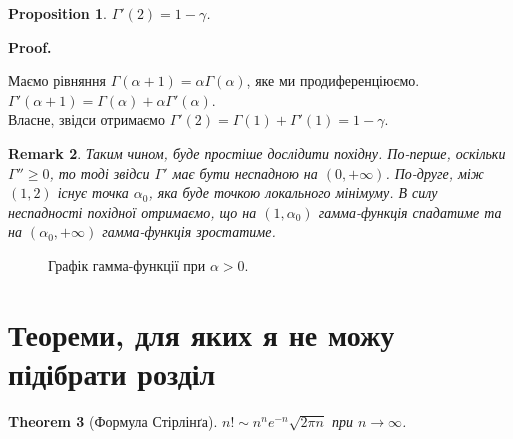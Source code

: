 \documentclass[a4paper, 10pt]{article}
\makeatletter
\theoremstyle{theoremdd}
\newtheorem{theorem}{Theorem}[subsection]
\theoremstyle{theoremdd}
\theoremstyle{theoremdd}
\theoremstyle{theoremdd}
\theoremstyle{theoremdd}
\theoremstyle{theoremdd}
\newtheorem{proposition}[theorem]{Proposition}
\theoremstyle{theoremdd}
\newtheorem{remark}[theorem]{Remark}
\theoremstyle{theoremdd}
\theoremstyle{theoremdd}
\renewenvironment{proof}[1][Proof.\\]{\par
\pushQED{\hfill \qed}%
\normalfont \topsep6\p@\@plus6\p@\relax
\trivlist
\item\relax
{\bfseries
#1\@addpunct{.}}\hspace\labelsep\ignorespaces
}{%
\popQED\endtrivlist\@endpefalse
}
\makeatother
\begin{document}
\begin{proposition}
$\Gamma'(2) = 1-\gamma$.
\end{proposition}

\begin{proof}
Маємо рівняння $\Gamma(\alpha+1) = \alpha \Gamma(\alpha)$, яке ми продиференціюємо.\\
$\Gamma'(\alpha+1) = \Gamma(\alpha) + \alpha \Gamma'(\alpha)$.\\
Власне, звідси отримаємо $\Gamma'(2) = \Gamma(1) + \Gamma'(1) = 1 - \gamma$.
\end{proof}

\begin{remark}
Таким чином, буде простіше дослідити похідну. По-перше, оскільки $\Gamma'' \geq 0$, то тоді звідси $\Gamma'$ має бути неспадною на $(0,+\infty)$. По-друге, між $(1,2)$ існує точка $\alpha_0$, яка буде точкою локального мінімуму. В силу неспадності похідної отримаємо, що на $(1,\alpha_0)$ гамма-функція спадатиме та на $(\alpha_0,+\infty)$ гамма-функція зростатиме.
\end{remark}

\begin{figure}[H]
\centering
{}
\caption*{Графік гамма-функції при $\alpha > 0$.}
\end{figure}

\newpage

\iffalse
\section*{Теореми, для яких я не можу підібрати розділ}
\begin{theorem}[Формула Стірлінґа]
$n! \sim n^n e^{-n} \sqrt{2\pi n}$ при $n \to \infty$.
\end{theorem}
\end{document}
